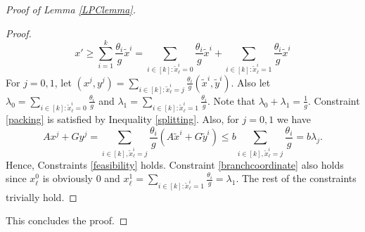 \documentclass[runningheads]{llncs}
\begin{document}
\begin{proof}[Proof of Lemma \ref{LPClemma}]
\begin{proof}
		\begin{equation}\label{splitting}
		x'\geq \sum_{i=1}^{k}\frac{\theta_i}{g} \tilde{x}^i
		={\sum_{i\in [k]: \tilde{x}^i_\ell =0}\frac{\theta_i}{g} \tilde{x}^i}+{\sum_{i\in [k]: \tilde{x}^i_\ell =1}\frac{\theta_i}{g} \tilde{x}^i}
		\end{equation}
		For $j=0,1$, let $(x^j,y^j) = \sum_{i\in [k]:\tilde{x}^i_\ell=j} \frac{\theta_i}{g}(\tilde{x}^i,\tilde{y}^i)$. Also let $\lambda_0=\sum_{i\in [k]: \tilde{x}^i_\ell =0}\frac{\theta_i}{g}$ and $\lambda_1 = \sum_{i\in [k]: \tilde{x}^i_\ell =1}\frac{\theta_i}{g}$. Note that $\lambda_0+\lambda_1 = \frac{1}{g}$. Constraint \ref{packing} is satisfied by Inequality \ref{splitting}. Also, for $j=0,1$ we have
		\begin{equation}
		Ax^j+Gy^j = \sum_{i\in[k], \tilde{x}^i_\ell = j} \frac{\theta_i}{g} (A\tilde{x}^i + G\tilde{y}^i) \leq b \sum_{i\in[k], \tilde{x}^i_\ell = j} \frac{\theta_i}{g} = b\lambda_j.
		\end{equation}
		Hence, Constraints \ref{feasibility} holds. Constraint \ref{branchcoordinate} also holds since $x^0_\ell$ is obviously $0$ and $x^1_\ell= \sum_{i\in [k]: \tilde{x}^i_\ell = 1}\frac{\theta_i}{g}= \lambda_1$. The rest of the constraints trivially hold. 
	\end{proof}
	This concludes the proof.	
\end{proof}
\end{document}
